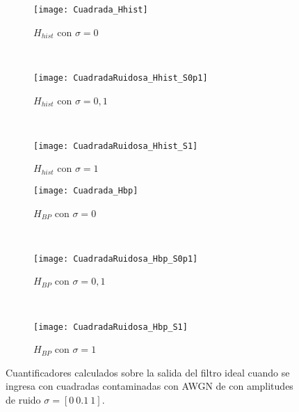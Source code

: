 \begin{figure}[h]
    \centering
    \begin{subfigure}[t]{0.32\textwidth}
        \texttt{[image: Cuadrada\_Hhist]}
        \caption{$H_{hist}$ con $\sigma=0$}
        \label{subfig:HhistCuadradaRuidosa_Sigma_0}
    \end{subfigure}
    ~ %
    \begin{subfigure}[t]{0.32\textwidth}
        \texttt{[image: CuadradaRuidosa\_Hhist\_S0p1]}
        \caption{$H_{hist}$ con $\sigma=0,1$}
        \label{subfig:HhistCuadradaRuidosa_Sigma_0p1}
    \end{subfigure}
    ~ %
    \begin{subfigure}[t]{0.32\textwidth}
        \texttt{[image: CuadradaRuidosa\_Hhist\_S1]}
        \caption{$H_{hist}$ con $\sigma=1$}
        \label{subfig:HhistCuadradaRuidosa_Sigma_1}
    \end{subfigure}
    \begin{subfigure}[t]{0.32\textwidth}
        \texttt{[image: Cuadrada\_Hbp]}
        \caption{$H_{BP}$ con $\sigma=0$}
        \label{subfig:HbpCuadradaRuidosa_Sigma_0}
    \end{subfigure}
    ~ %
    \begin{subfigure}[t]{0.32\textwidth}
        \texttt{[image: CuadradaRuidosa\_Hbp\_S0p1]}
        \caption{$H_{BP}$ con $\sigma=0,1$}
        \label{subfig:HbpCuadradaRuidosa_Sigma_0p1}
    \end{subfigure}
    ~ %
    \begin{subfigure}[t]{0.32\textwidth}
        \texttt{[image: CuadradaRuidosa\_Hbp\_S1]}
        \caption{$H_{BP}$ con $\sigma=1$}
        \label{subfig:HbpCuadradaRuidosa_Sigma_1}
    \end{subfigure}
    \caption{Cuantificadores calculados sobre la salida del filtro ideal cuando se ingresa con cuadradas contaminadas con AWGN de con amplitudes de ruido $\sigma=[0~0.1~1]$.}\label{fig:HCuadradaRuidosa_Sigma}
\end{figure}